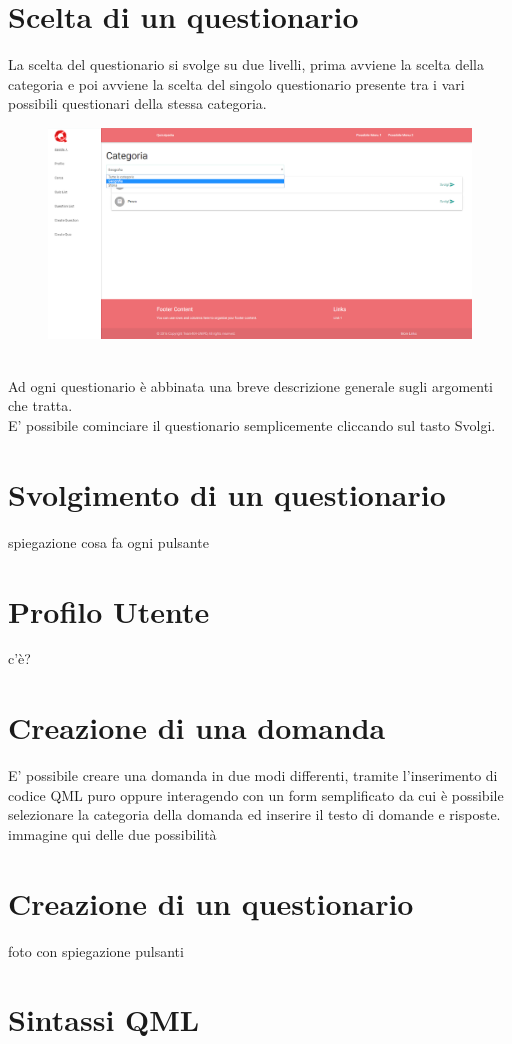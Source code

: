 \documentclass[a4paper,11pt]{article}
\begin{document}
	\section{Scelta di un questionario}
	La scelta del questionario si svolge su due livelli, prima avviene la scelta della categoria e poi avviene la scelta del singolo questionario presente tra i vari possibili questionari della stessa categoria.
	\begin{figure}[h!]
	\begin{center}
	\includegraphics[scale=0.5]{../images/screen_category.png}
	\end{center}
	\end{figure}
	\\
	Ad ogni questionario è abbinata una breve descrizione generale sugli argomenti che tratta.\\ E' possibile cominciare il questionario semplicemente cliccando sul tasto Svolgi.
	\newpage
	\section{Svolgimento di un questionario}
	spiegazione cosa fa ogni pulsante
	\newpage
	\section{Profilo Utente}
	c'è?
	\newpage
	\section{Creazione di una domanda}
	E' possibile creare una domanda in due modi differenti, tramite l'inserimento di codice QML puro oppure interagendo con un form semplificato da cui è possibile selezionare la categoria della domanda ed inserire il testo di domande e risposte. \\
	immagine qui delle due possibilità
	\newpage
	\section{Creazione di un questionario}
	foto con spiegazione pulsanti
	\newpage
	\section{Sintassi QML}
	
\end{document}
